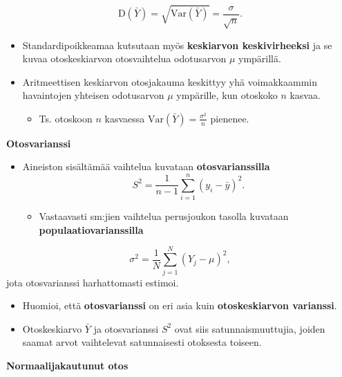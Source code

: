 \documentclass[
]{book}
\providecommand{\tightlist}{%
  \setlength{\itemsep}{0pt}\setlength{\parskip}{0pt}}
\begin{document}
\[
\text{D}(\bar{Y}) = \sqrt{\mathrm{Var}(\bar{Y})} = \frac{\sigma}{\sqrt{n}}.
\]

\begin{itemize}
\item
  Standardipoikkeamaa kutsutaan myös \textbf{keskiarvon keskivirheeksi} ja se kuvaa otoskeskiarvon otosvaihtelua odotusarvon \(\mu\) ympärillä.
\item
  Aritmeettisen keskiarvon otosjakauma keskittyy yhä voimakkaammin havaintojen yhteisen odotusarvon \(\mu\) ympärille, kun otoskoko \(n\) kasvaa.

  \begin{itemize}
  \tightlist
  \item
    Ts. otoskoon \(n\) kasvaessa \(\mathrm{Var}(\bar{Y}) = \frac{\sigma^2}{n}\) pienenee.
  \end{itemize}
\end{itemize}

\textbf{Otosvarianssi}

\begin{itemize}
\item
  Aineiston sisältämää vaihtelua kuvataan \textbf{otosvarianssilla}
  \[
  S^2= \frac{1}{n-1} \sum_{i=1}^{n} (y_i - \bar{y})^2.
  \]

  \begin{itemize}
  \tightlist
  \item
    Vastaavasti sm:jien vaihtelua perusjoukon tasolla kuvataan \textbf{populaatiovarianssilla}
  \end{itemize}
\end{itemize}

\[
\sigma^2= \frac{1}{N} \sum_{j=1}^{N} (Y_j - \mu)^2,
\]
jota otosvarianssi harhattomasti estimoi.

\begin{itemize}
\item
  Huomioi, että \textbf{otosvarianssi} on eri asia kuin \textbf{otoskeskiarvon varianssi}.
\item
  Otoskeskiarvo \(\bar{Y}\) ja otosvarianssi \(S^2\) ovat siis satunnaismuuttujia, joiden saamat arvot vaihtelevat satunnaisesti otoksesta toiseen.
\end{itemize}

\textbf{Normaalijakautunut otos}
\end{document}

